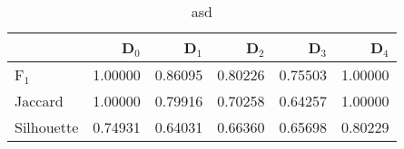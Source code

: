 \begin{table}
\centering
\caption{asd}
\label{tab:s1-cont-eca-single}
\begin{tabular}{lrrrrr}
\toprule
{} &   D$_0$ &   D$_1$ &   D$_2$ &   D$_3$ &   D$_4$ \\
\midrule
F$_1$      & 1.00000 & 0.86095 & 0.80226 & 0.75503 & 1.00000 \\
Jaccard    & 1.00000 & 0.79916 & 0.70258 & 0.64257 & 1.00000 \\
Silhouette & 0.74931 & 0.64031 & 0.66360 & 0.65698 & 0.80229 \\
\bottomrule
\end{tabular}
\end{table}

